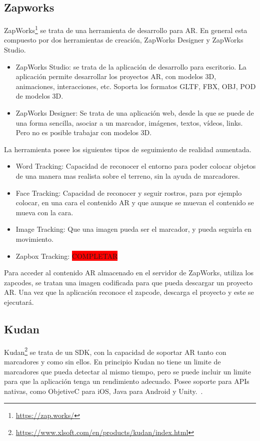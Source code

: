 \subsection{Zapworks} ZapWorks\footnote{\url{https://zap.works/}} se trata de una herramienta de desarrollo para AR. En general esta compuesto por dos herramientas de creación, ZapWorks Designer y ZapWorks Studio.
\begin{itemize}
	\item ZapWorks Studio: se trata de la aplicación de desarrollo para escritorio. La aplicación permite desarrollar los proyectos AR, con modelos 3D, animaciones, interacciones, etc. Soporta los formatos  GLTF, FBX, OBJ, POD de modelos 3D.
	\item ZapWorks Designer: Se trata de una aplicación web, desde la que se puede de una forma sencilla, asociar a un marcador, imágenes, textos, vídeos, links. Pero no es posible trabajar con modelos 3D.
\end{itemize}	
La herramienta posee los siguientes tipos de seguimiento de realidad aumentada.
\begin{itemize}
	\item Word Tracking: Capacidad de reconocer el entorno para poder colocar objetos de una manera mas realista sobre el terreno, sin la ayuda de marcadores.
	\item Face Tracking: Capacidad de reconocer y seguir rostros, para por ejemplo colocar, en una cara el contenido AR y que aunque se muevan el contenido se mueva con la cara.
	\item Image Tracking: Que una imagen pueda ser el marcador, y pueda seguirla en movimiento.
	\item Zapbox Tracking: \colorbox{red}{COMPLETAR}
	 
\end{itemize}
Para acceder al contenido AR almacenado en el servidor de ZapWorks, utiliza los zapcodes, se tratan una imagen codificada para que pueda descargar un proyecto AR. Una vez que la aplicación reconoce el zapcode, descarga el proyecto y este se ejecutará.


\subsection{Kudan} Kudan\footnote{\url{https://www.xlsoft.com/en/products/kudan/index.html}} 
se trata de un SDK, con la capacidad de soportar AR tanto con marcadores y como sin ellos. En principio Kudan no tiene un limite de marcadores que pueda detectar al mismo tiempo, pero se puede incluir un limite para que la aplicación tenga un rendimiento adecuado. 
Posee soporte para APIs nativas, como ObjetiveC para iOS, Java para Android y Unity.~\cite{kudan_developer_hub}.

